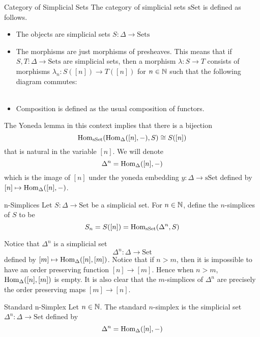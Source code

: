\documentclass[a4paper]{article}
\begin{document}
\begin{defn}{Category of Simplicial Sets}{} The category of simplicial sets $\text{sSet}$ is defined as follows. 
\begin{itemize}
\item The objects are simplicial sets $S:\Delta\to\text{Sets}$
\item The morphisms are just morphisms of presheaves. This means that if $S,T:\Delta\to\text{Sets}$ are simplicial sets, then a morphism $\lambda:S\to T$ consists of morphisms $\lambda_n:S([n])\to T([n])$ for $n\in\mathbb{N}$ such that the following diagram commutes: \\~\\
\item Composition is defined as the usual composition of functors. 
\end{itemize}
\end{defn}

The Yoneda lemma in this context implies that there is a bijection $$\operatorname{Hom}_{\text{sSet}}(\operatorname{Hom}_\Delta([n],-),S)\cong S([n])$$ that is natural in the variable $[n]$. We will denote $$\Delta^n=\operatorname{Hom}_\Delta([n],-)$$ which is the image of $[n]$ under the yoneda embedding $y:\Delta\to\text{sSet}$ defined by $[n]\mapsto\operatorname{Hom}_\Delta([n],-)$. 

\begin{defn}{n-Simplices}{} Let $S:\Delta\to\text{Set}$ be a simplicial set. For $n\in\mathbb{N}$, define the $n$-simplices of $S$ to be $$S_n=S([n])=\operatorname{Hom}_\text{sSet}(\Delta^n,S)$$
\end{defn}

Notice that $\Delta^n$ is a simplicial set $$\Delta^n:\Delta\to\text{Set}$$ defined by $[m]\mapsto\operatorname{Hom}_\Delta([n],[m])$. Notice that if $n>m$, then it is impossible to have an order preserving function $[n]\to[m]$. Hence when $n>m$, $\operatorname{Hom}_\Delta([n],[m])$ is empty. It is also clear that the $m$-simplices of $\Delta^n$ are precisely the order preserving maps $[m]\to[n]$. 

\begin{defn}{Standard n-Simplex}{} Let $n\in\mathbb{N}$. The standard $n$-simplex is the simplicial set $\Delta^n:\Delta\to\text{Set}$ defined by $$\Delta^n=\operatorname{Hom}_\Delta([n],-)$$
\end{defn}
\end{document}
